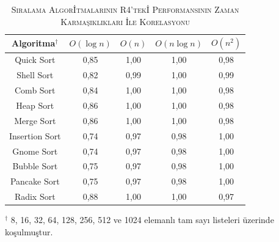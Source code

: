 \documentclass[conference, a4paper]{IEEEtran}
\begin{document}
\begin{table}[h]
  \centering
  \caption{\textsc{Sıralama Algor{\footnotesize İ}tmalarının R4'tek{\footnotesize İ} Performansının Zaman Karmaşıklıkları {\footnotesize İ}le Korelasyonu}}
  \label{tab:time-complexity-vs-measurements-correlation}
  \begin{tabular}{|c|c|c|c|c|}
    \hline
    {Algoritma$^{\dagger}$} & {$O(\log n)$} & {$O(n)$} & {$O(n \log n)$} & {$O(n^2)$} \\
    \hline
    Quick Sort & 0,85 & 1,00 & 1,00 & 0,98 \\
    \hline
    Shell Sort & 0,82 & 0,99 & 1,00 & 0,99 \\
    \hline
    Comb Sort & 0,84 & 1,00 & 1,00 & 0,98 \\
    \hline
    Heap Sort & 0,86 & 1,00 & 1,00 & 0,98 \\
    \hline
    Merge Sort & 0,86 & 1,00 & 1,00 & 0,98 \\
    \hline
    Insertion Sort & 0,74 & 0,97 & 0,98 & 1,00 \\
    \hline
    Gnome Sort & 0,74 & 0,97 & 0,98 & 1,00 \\
    \hline
    Bubble Sort & 0,75 & 0,97 & 0,98 & 1,00 \\
    \hline
    Pancake Sort & 0,75 & 0,97 & 0,98 & 1,00 \\
    \hline
    Radix Sort & 0,88 & 1,00 & 1,00 & 0,97 \\
    \hline
  \end{tabular}
  \vspace{1mm}

  \raggedright\footnotesize{$^{\dagger}$ 8, 16, 32, 64, 128, 256, 512 ve 1024 elemanlı tam sayı listeleri üzerinde koşulmuştur.}
\end{table}
\end{document}
